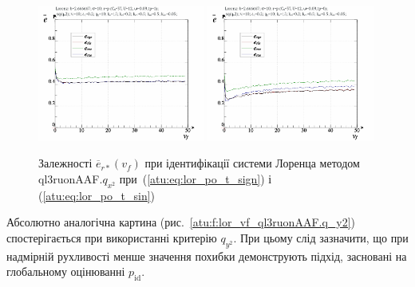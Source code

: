 \begin{figure}[ht!]
  \centerline{
    \includegraphics[width=0.49\textwidth]{p/cha/lor/ql3ruonAAF/lor_ql3ruonAAF_qx2-p_v_f_e_sign.png}
    \hfill
    \includegraphics[width=0.49\textwidth]{p/cha/lor/ql3ruonAAF/lor_ql3ruonAAF_qx2-p_v_f_e_sin.png}
  }
\caption{Залежності $ \overline{e}_{r *} (v_f) $ при ідентифікації системи Лоренца методом ql3ruonAAF.$q_{x^2} $ при~(\ref{atu:eq:lor_po_t_sign}) і (\ref{atu:eq:lor_po_t_sin})}
  \label{atu:f:lor_vf_ql3ruonAAF.q_x2}
\end{figure}

Абсолютно аналогічна картина (рис.~\ref{atu:f:lor_vf_ql3ruonAAF.q_y2})
спостерігається при використанні критерію
$q_{y^2}$.
При цьому слід зазначити, що при надмірній рухливості менше
значення похибки демонструють підхід, засновані на глобальному
оцінюванні
$ p_\mathrm{id} $.


